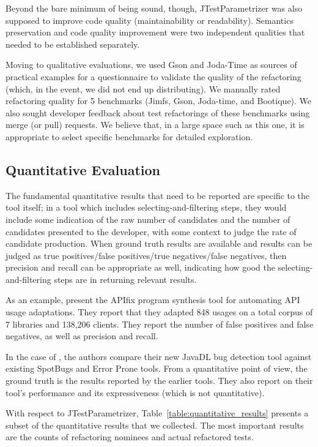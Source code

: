 Beyond the bare minimum of being sound, though, JTestParametrizer was
also supposed to improve code quality (maintainability or
readability). Semantics preservation and code quality improvement were
two independent qualities that needed to be established separately.

Moving to qualitative evaluations, we used Gson and Joda-Time as
sources of practical examples for a questionnaire to validate the
quality of the refactoring (which, in the event, we did not end up
distributing).  We manually rated refactoring quality for 5 benchmarks
(Jimfs, Gson, Joda-time, and Bootique). We also sought developer
feedback about test refactorings of these benchmarks using merge (or pull)
requests.  We believe that, in a large space such as this one, it is
appropriate to select specific benchmarks for detailed exploration.

\subsection{Quantitative Evaluation}
The fundamental quantitative results that need to be reported are
specific to the tool itself; in a tool which includes selecting-and-filtering
steps, they would include some indication of the raw number of candidates
and the number of candidates presented to the developer, with some 
context to judge the rate of candidate production. When ground truth 
results are available and results can be judged as true positives/false positives/true negatives/false negatives,
then precision and recall can be appropriate as well, indicating how good
the selecting-and-filtering steps are in returning relevant results.

As an example,  present the {\sc APIfix} program synthesis tool for automating API usage adaptations. They report that they adapted 848 usages on a total corpus of 7 libraries and 138,206 clients. They report the number of false positives and false negatives, as well as precision and recall.

In the case of \cite{dura21:_javad}, the authors compare their new {\sc JavaDL} bug detection tool against existing SpotBugs and Error Prone tools. From a quantitative point of view, the ground truth is the results reported by the earlier tools. They also report on their tool's performance and its expressiveness (which is not quantitative).

With respect to JTestParametrizer,
Table~\ref{table:quantitative_results} presents a subset of the
quantitative results that we collected. The most important results are
the counts of refactoring nominees and actual refactored tests. 

